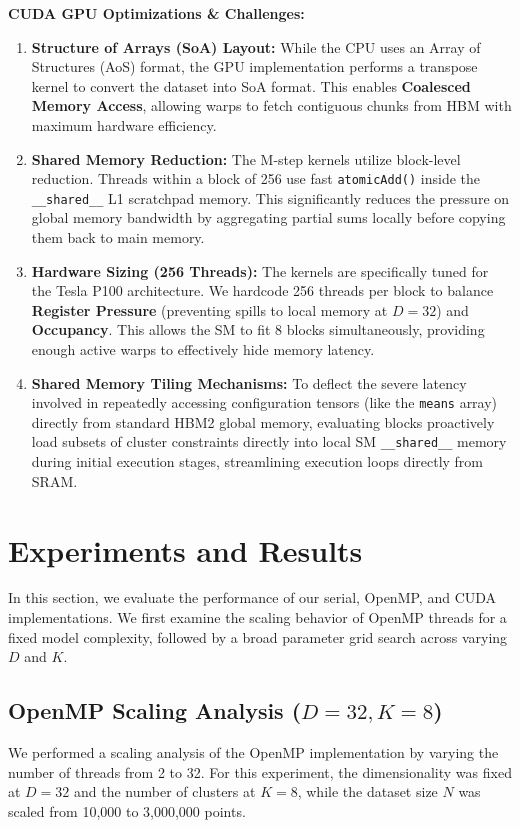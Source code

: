 \documentclass[10pt]{article}
\begin{document}
\textbf{CUDA GPU Optimizations \& Challenges:}
\begin{enumerate}
    \item \textbf{Structure of Arrays (SoA) Layout:} While the CPU uses an Array of Structures (AoS) format, the GPU implementation performs a transpose kernel to convert the dataset into SoA format. This enables \textbf{Coalesced Memory Access}, allowing warps to fetch contiguous chunks from HBM with maximum hardware efficiency.
    \item \textbf{Shared Memory Reduction:} The M-step kernels utilize block-level reduction. Threads within a block of 256 use fast \texttt{atomicAdd()} inside the \texttt{\_\_shared\_\_} L1 scratchpad memory. This significantly reduces the pressure on global memory bandwidth by aggregating partial sums locally before copying them back to main memory.
    \item \textbf{Hardware Sizing (256 Threads):} The kernels are specifically tuned for the Tesla P100 architecture. We hardcode 256 threads per block to balance \textbf{Register Pressure} (preventing spills to local memory at $D=32$) and \textbf{Occupancy}. This allows the SM to fit 8 blocks simultaneously, providing enough active warps to effectively hide memory latency.
    \item \textbf{Shared Memory Tiling Mechanisms:} To deflect the severe latency involved in repeatedly accessing configuration tensors (like the \texttt{means} array) directly from standard HBM2 global memory, evaluating blocks proactively load subsets of cluster constraints directly into local SM \texttt{\_\_shared\_\_} memory during initial execution stages, streamlining execution loops directly from SRAM.
\end{enumerate}

\section{Experiments and Results}
In this section, we evaluate the performance of our serial, OpenMP, and CUDA implementations. We first examine the scaling behavior of OpenMP threads for a fixed model complexity, followed by a broad parameter grid search across varying $D$ and $K$.

\subsection{OpenMP Scaling Analysis ($D=32, K=8$)}
We performed a scaling analysis of the OpenMP implementation by varying the number of threads from 2 to 32. For this experiment, the dimensionality was fixed at $D=32$ and the number of clusters at $K=8$, while the dataset size $N$ was scaled from 10,000 to 3,000,000 points.
\end{document}
